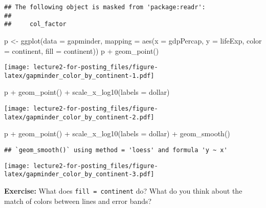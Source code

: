 \documentclass[
]{article}
\newenvironment{Shaded}{\begin{snugshade}}{\end{snugshade}}
\newcommand{\AttributeTok}[1]{\textcolor[rgb]{0.77,0.63,0.00}{#1}}
\newcommand{\FunctionTok}[1]{\textcolor[rgb]{0.00,0.00,0.00}{#1}}
\newcommand{\NormalTok}[1]{#1}
\newcommand{\OtherTok}[1]{\textcolor[rgb]{0.56,0.35,0.01}{#1}}
\newcommand{\SpecialCharTok}[1]{\textcolor[rgb]{0.00,0.00,0.00}{#1}}
\begin{document}
\begin{verbatim}
## The following object is masked from 'package:readr':
## 
##     col_factor
\end{verbatim}

\begin{Shaded}
\begin{Highlighting}[]
\NormalTok{p }\OtherTok{\textless{}{-}} \FunctionTok{ggplot}\NormalTok{(}\AttributeTok{data =}\NormalTok{ gapminder,}
            \AttributeTok{mapping =} \FunctionTok{aes}\NormalTok{(}\AttributeTok{x =}\NormalTok{ gdpPercap, }\AttributeTok{y =}\NormalTok{ lifeExp, }\AttributeTok{color =}\NormalTok{ continent, }\AttributeTok{fill =}\NormalTok{ continent))}
\NormalTok{p }\SpecialCharTok{+} \FunctionTok{geom\_point}\NormalTok{()}
\end{Highlighting}
\end{Shaded}

\texttt{[image: lecture2-for-posting\_files/figure-latex/gapminder\_color\_by\_continent-1.pdf]}

\begin{Shaded}
\begin{Highlighting}[]
\NormalTok{p }\SpecialCharTok{+} \FunctionTok{geom\_point}\NormalTok{() }\SpecialCharTok{+} \FunctionTok{scale\_x\_log10}\NormalTok{(}\AttributeTok{labels =}\NormalTok{ dollar)}
\end{Highlighting}
\end{Shaded}

\texttt{[image: lecture2-for-posting\_files/figure-latex/gapminder\_color\_by\_continent-2.pdf]}

\begin{Shaded}
\begin{Highlighting}[]
\NormalTok{p }\SpecialCharTok{+} \FunctionTok{geom\_point}\NormalTok{() }\SpecialCharTok{+} \FunctionTok{scale\_x\_log10}\NormalTok{(}\AttributeTok{labels =}\NormalTok{ dollar) }\SpecialCharTok{+} \FunctionTok{geom\_smooth}\NormalTok{()}
\end{Highlighting}
\end{Shaded}

\begin{verbatim}
## `geom_smooth()` using method = 'loess' and formula 'y ~ x'
\end{verbatim}

\texttt{[image: lecture2-for-posting\_files/figure-latex/gapminder\_color\_by\_continent-3.pdf]}

\textbf{Exercise:} What does \texttt{fill\ =\ continent} do? What do you
think about the match of colors between lines and error bands?
\end{document}
